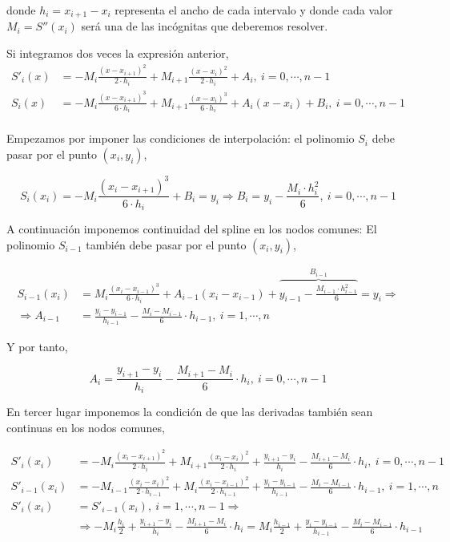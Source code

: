 donde $h_i=x_{i+1}-x_i$ representa el ancho de cada intervalo y donde cada valor $M_i=S''(x_i)$ será una de las incógnitas que deberemos resolver.

Si integramos dos veces la expresión anterior,
\begin{align*}
S'_i(x)&=-M_i\frac{(x-x_{i+1})^2}{2\cdot h_i}+M_{i+1}\frac{(x-x_i)^2}{2\cdot h_i}+A_i,\   i=0,\cdots, n-1\\
S_i(x)&=-M_i\frac{(x-x_{i+1})^3}{6\cdot h_i}+M_{i+1}\frac{(x-x_i)^3}{6\cdot h_i}+A_i(x-x_i)+B_i,\   i=0,\cdots, n-1\\
\end{align*}

Empezamos por imponer las condiciones de interpolación: el polinomio $S_i$ debe pasar por el punto $(x_i,y_i)$,

\begin{equation*}
S_i(x_i)=-M_i\frac{(x_i-x_{i+1})^3}{6\cdot h_i}+B_i=y_i \Rightarrow B_i=y_i-\frac{M_i\cdot h_i^2}{6},\ i=0,\cdots, n-1
\end{equation*}

A continuación imponemos continuidad del spline en los nodos comunes: El polinomio $S_{i-1}$ también debe pasar por el punto $(x_i, y_i)$,

\begin{align*}
S_{i-1}(x_i)&=M_i\frac{(x_i-x_{i-1})^3}{6\cdot h_i}+A_{i-1}(x_i-x_{i-1})+\overbrace{y_{i-1}-\frac{M_{i-1}\cdot h_{i-1}^2}{6}}^{B_{i-1}}=y_i \Rightarrow\\
\Rightarrow A_{i-1}&=\frac{y_i-y_{i-1}}{h_{i-1}}-\frac{M_i-M_{i-1}}{6}\cdot h_{i-1}, \ i=1,\cdots, n
\end{align*}

Y por tanto,

\begin{equation*}
A_i=\frac{y_{i+1}-y_i}{h_i}-\frac{M_{i+1}-M_i}{6}\cdot h_i, \ i=0,\cdots, n-1
\end{equation*}

En tercer lugar imponemos la condición de que las derivadas también sean continuas en los nodos comunes,

\begin{align*}
S'_i(x_i)&=-M_i\frac{(x_i-x_{i+1})^2}{2\cdot h_i}+M_{i+1}\frac{(x_i-x_i)^2}{2\cdot h_i}+\frac{y_{i+1}-y_i}{h_i}-\frac{M_{i+1}-M_i}{6}\cdot h_i,\   i=0,\cdots, n-1\\
S'_{i-1}(x_i)&=-M_{i-1}\frac{(x_i-x_i)^2}{2\cdot h_{i-1}}+M_{i}\frac{(x_i-x_{i-1})^2}{2\cdot h_{i-1 }}+\frac{y_i-y_{i-1}}{h_{i-1}}-\frac{M_i-M_{i-1}}{6}\cdot h_{i-1},\   i=1,\cdots, n\\
S'_i(x_i)&=S'_{i-1}(x_i) ,\   i=1,\cdots, n-1 \Rightarrow\\
&\Rightarrow -M_i\frac{h_i}{2}+\frac{y_{i+1}-y_i}{h_i}-\frac{M_{i+1}-M_i}{6}\cdot h_i=M_{i}\frac{h_{i-1}}{2}+\frac{y_i-y_{i-1}}{h_{i-1}}-\frac{M_i-M_{i-1}}{6}\cdot h_{i-1}
\end{align*}

